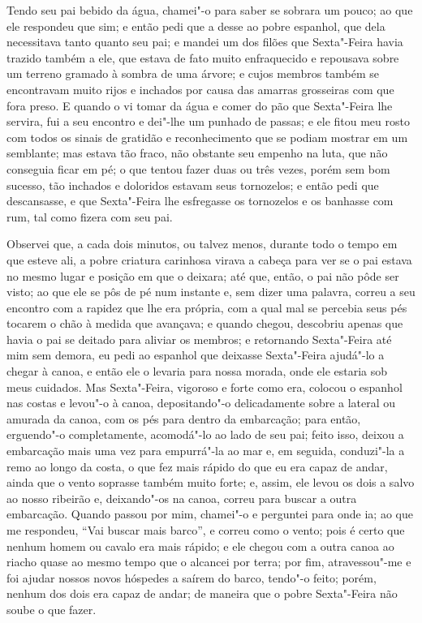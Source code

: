 Tendo seu pai bebido da água, chamei"-o para saber se sobrara um pouco;
ao que ele respondeu que sim; e então pedi que a desse ao pobre
espanhol, que dela necessitava tanto quanto seu pai; e mandei um dos
filões que Sexta"-Feira havia trazido também a ele, que estava de fato
muito enfraquecido e repousava sobre um terreno gramado à sombra de uma
árvore; e cujos membros também se encontravam muito rijos e inchados por
causa das amarras grosseiras com que fora preso. E quando o vi tomar da
água e comer do pão que Sexta"-Feira lhe servira, fui a seu encontro e
dei"-lhe um punhado de passas; e ele fitou meu rosto com todos os sinais
de gratidão e reconhecimento que se podiam mostrar em um semblante; mas
estava tão fraco, não obstante seu empenho na luta, que não conseguia
ficar em pé; o que tentou fazer duas ou três vezes, porém sem bom
sucesso, tão inchados e doloridos estavam seus tornozelos; e então pedi
que descansasse, e que Sexta"-Feira lhe esfregasse os tornozelos e os
banhasse com rum, tal como fizera com seu pai.

Observei que, a cada dois minutos, ou talvez menos, durante todo o tempo
em que esteve ali, a pobre criatura carinhosa virava a cabeça para ver
se o pai estava no mesmo lugar e posição em que o deixara; até que,
então, o pai não pôde ser visto; ao que ele se pôs de pé num instante e,
sem dizer uma palavra, correu a seu encontro com a rapidez que lhe era
própria, com a qual mal se percebia seus pés tocarem o chão à medida que
avançava; e quando chegou, descobriu apenas que havia o pai se deitado
para aliviar os membros; e retornando Sexta"-Feira até mim sem demora, eu
pedi ao espanhol que deixasse Sexta"-Feira ajudá"-lo a chegar à canoa, e
então ele o levaria para nossa morada, onde ele estaria sob meus
cuidados. Mas Sexta"-Feira, vigoroso e forte como era, colocou o espanhol
nas costas e levou"-o à canoa, depositando"-o delicadamente sobre a
lateral ou amurada da canoa, com os pés para dentro da embarcação; para
então, erguendo"-o completamente, acomodá"-lo ao lado de seu pai; feito
isso, deixou a embarcação mais uma vez para empurrá"-la ao mar e, em
seguida, conduzi"-la a remo ao longo da costa, o que fez mais rápido do
que eu era capaz de andar, ainda que o vento soprasse também muito
forte; e, assim, ele levou os dois a salvo ao nosso ribeirão e,
deixando"-os na canoa, correu para buscar a outra embarcação. Quando
passou por mim, chamei"-o e perguntei para onde ia; ao que me respondeu,
``Vai buscar mais barco'', e correu como o vento; pois é certo que
nenhum homem ou cavalo era mais rápido; e ele chegou com a outra canoa
ao riacho quase ao mesmo tempo que o alcancei por terra; por fim,
atravessou"-me e foi ajudar nossos novos hóspedes a saírem do barco,
tendo"-o feito; porém, nenhum dos dois era capaz de andar; de maneira que
o pobre Sexta"-Feira não soube o que fazer.

